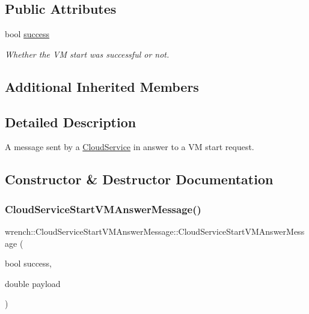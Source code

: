 \subsection*{Public Attributes}
\begin{DoxyCompactItemize}
\item 
\mbox{\label{classwrench_1_1_cloud_service_start_v_m_answer_message_a210f9d0e1ede709fe81b2f3b9a2ce62d}} 
bool \hyperlink{classwrench_1_1_cloud_service_start_v_m_answer_message_a210f9d0e1ede709fe81b2f3b9a2ce62d}{success}
\begin{DoxyCompactList}\small\item\em Whether the VM start was successful or not. \end{DoxyCompactList}\end{DoxyCompactItemize}
\subsection*{Additional Inherited Members}


\subsection{Detailed Description}
A message sent by a \hyperlink{classwrench_1_1_cloud_service}{Cloud\+Service} in answer to a VM start request. 

\subsection{Constructor \& Destructor Documentation}
\mbox{\label{classwrench_1_1_cloud_service_start_v_m_answer_message_abdd9a5d9c840ea52c927350b2cba03f6}} 
\subsubsection{\texorpdfstring{Cloud\+Service\+Start\+V\+M\+Answer\+Message()}{CloudServiceStartVMAnswerMessage()}}
{\footnotesize\ttfamily wrench\+::\+Cloud\+Service\+Start\+V\+M\+Answer\+Message\+::\+Cloud\+Service\+Start\+V\+M\+Answer\+Message (\begin{DoxyParamCaption}\item[{bool}]{success,  }\item[{double}]{payload }\end{DoxyParamCaption})}



